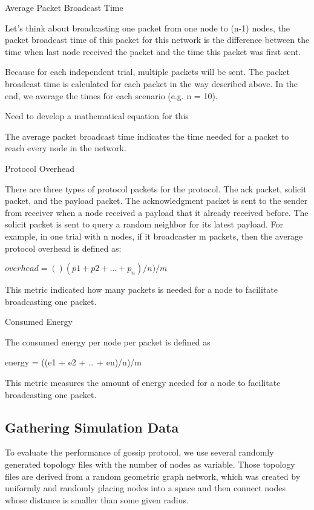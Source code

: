 Average Packet Broadcast Time

Let's think about broadcasting one packet from one node to (n-1) nodes, the packet broadcast time of this packet for this network is the difference between the time when last node received the packet and the time this packet was first sent.

Because for each independent trial, multiple packets will be sent. The packet broadcast time is calculated for each packet in the way described above. In the end, we average the times for each scenario (e.g. n = 10). 

Need to develop a mathematical equation for this

The average packet broadcast time indicates the time needed for a packet to reach every node in the network.

Protocol Overhead

There are three types of protocol packets for the protocol. The ack packet, solicit packet, and the payload packet. The acknowledgment packet is sent to the sender from receiver when a node received a payload that it already received before. The solicit packet is sent to query a random neighbor for its latest payload. For example, in one trial with n nodes, if it broadcaster m packets, then the average protocol overhead is defined as:

$overhead = ()(p1 + p2 + … + p_n) / n) / m$

This metric indicated how many packets is needed for a node to facilitate broadcasting one packet. 

Consumed Energy

The consumed energy per node per packet is defined as

energy = ((e1 + e2 + … + en)/n)/m

This metric measures the amount of energy needed for a node to facilitate broadcasting one packet. 


\subsection{Gathering Simulation Data}

To evaluate the performance of gossip protocol, we use several randomly generated topology files with the number of nodes as variable. Those topology files are derived from a random geometric graph network, which was created by uniformly and randomly placing nodes into a space and then connect nodes whose distance is smaller than some given radius.

